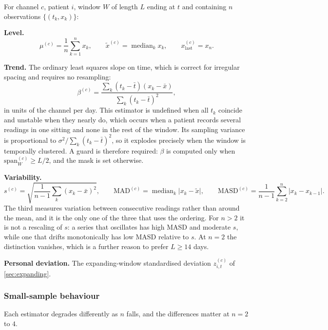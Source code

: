 \documentclass[12pt,a4paper,oneside]{report}
\begin{document}
For channel $c$, patient $i$, window $W$ of length $L$ ending at $t$ and containing $n$ observations $\{(t_k, x_k)\}$:

\textbf{Level.}
\begin{equation}
  \mu^{(c)} = \frac{1}{n}\sum_{k=1}^{n} x_k,
  \qquad
  \tilde{x}^{(c)} = \operatorname{median}_k x_k,
  \qquad
  x^{(c)}_{\text{last}} = x_n.
\end{equation}

\textbf{Trend.} The ordinary least squares slope on time, which is correct for irregular spacing and requires no resampling:
\begin{equation}
  \beta^{(c)} = \frac{\sum_{k}(t_k - \bar t)(x_k - \bar x)}{\sum_{k}(t_k - \bar t)^2},
\end{equation}
in units of the channel per day. This estimator is undefined when all $t_k$ coincide and unstable when they nearly do, which occurs when a patient records several readings in one sitting and none in the rest of the window. Its sampling variance is proportional to $\sigma^2 / \sum_k (t_k - \bar t)^2$, so it explodes precisely when the window is temporally clustered. A guard is therefore required: $\beta$ is computed only when $\mathrm{span}_W^{(c)} \geq L/2$, and the mask is set otherwise.

\textbf{Variability.}
\begin{equation}
  s^{(c)} = \sqrt{\frac{1}{n-1}\sum_k (x_k - \bar x)^2},
  \qquad
  \mathrm{MAD}^{(c)} = \operatorname{median}_k\bigl\lvert x_k - \tilde x\bigr\rvert,
  \qquad
  \mathrm{MASD}^{(c)} = \frac{1}{n-1}\sum_{k=2}^{n}\bigl\lvert x_k - x_{k-1}\bigr\rvert.
\end{equation}
The third measures variation between consecutive readings rather than around the mean, and it is the only one of the three that uses the ordering. For $n > 2$ it is not a rescaling of $s$: a series that oscillates has high MASD and moderate $s$, while one that drifts monotonically has low MASD relative to $s$. At $n = 2$ the distinction vanishes, which is a further reason to prefer $L \geq 14$ days.

\textbf{Personal deviation.} The expanding-window standardised deviation $z^{(c)}_{i,t}$ of \cref{sec:expanding}.

\subsubsection{Small-sample behaviour}\label{sec:small-sample}

Each estimator degrades differently as $n$ falls, and the differences matter at $n = 2$ to $4$.
\end{document}
